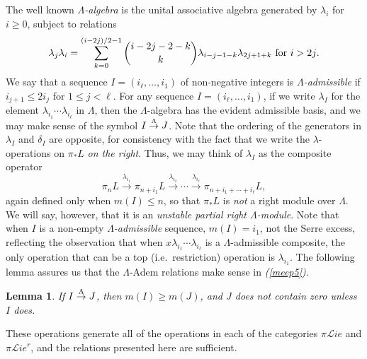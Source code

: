 \documentclass[11pt]{amsart} \renewcommand{\baselinestretch}{1.2}
\theoremstyle{plain}
\newtheorem{lem}[thm]{Lemma}
\numberwithin{equation}{section} %
\theoremstyle{plain}
\newtheorem{lem}[thm]{Lemma}
\numberwithin{equation}{chapter} %
\renewcommand{\to}{\longrightarrow}
\newcommand{\scrL}{\mathscr{L}}
\newcommand{\PA}[1]{\pi#1}
\newcommand{\minDimDelta}{m}
\newcommand{\produces}[3]{#3:#1\sim #2}
\renewcommand{\produces}[3]{#1\rightarrow_{#3} #2}%
\renewcommand{\produces}[3]{#1\overset{\smash{#3}}{\rightarrow} #2}%
\newcommand{\liealgs}{{\scrL\!\textit{ie}}}
\newcommand{\restliealgs}{{\scrL\!\textit{ie}^\textit{r}}}
\begin{document}
\begin{Constructing homotopy operations}
The well known \emph{$\Lambda$-algebra} is the unital associative algebra generated by $\lambda_i$ for $i\geq0$, subject to relations \[\lambda_j\lambda_i=\sum_{k=0}^{(i-2j)/2-1}\binom{i-2j-2-k}{ k}\lambda_{i-j-1-k}\lambda_{2j+1+k}\textup{\ for $i>2j$.}\]
We say that a sequence $I=(i_\ell,\ldots,i_1)$ of non-negative integers is \emph{$\Lambda$-admissible} if $i_{j+1}\leq 2i_j$ for $1\leq j <\ell$. 
For any sequence $I=(i_\ell,\ldots,i_1)$, if we write $\lambda_I$ for the element $\lambda_{i_1}\cdots \lambda_{i_\ell}$ in $\Lambda$, then the $\Lambda$-algebra has the evident admissible basis, and we may make sense of the symbol $\produces{I}{J}{\Lambda}$. Note that the ordering of the generators in $\lambda_I$ and $\delta_I$ are opposite, for consistency with the fact that we write the $\lambda$-operations on $\pi_*L$ \emph{on the right}. Thus, we may think of $\lambda_I$ as the composite operator  
\[\pi_{n}L\overset{\lambda_{i_1}}{\to}\pi_{n+i_1}L\overset{\lambda_{i_2}}{\to}\cdots \overset{\lambda_{i_\ell}}{\to}\pi_{n+i_1+\cdots +i_\ell}L,\]
again defined only when $\minDimDelta(I)\leq n$, so that $\pi_*L$ is \emph{not} a right module over $\Lambda$. We will say, however, that it is an \emph{unstable partial right $\Lambda$-module}.
Note that when $I$ is a non-empty \emph{$\Lambda$-admissible} sequence,
$\minDimDelta(I)=i_1$, not the Serre excess, reflecting the observation that when $x\lambda_{i_1}\cdots \lambda_{i_\ell}$ is a $\Lambda$-admissible composite, the only operation that  can be a top (i.e.\ restriction) operation is $\lambda_{i_1}$.
The following lemma assures us that the $\Lambda$-Adem relations make sense in \emph{(\ref{meep5})}.
\begin{lem}
\label{lemOnAdemChangeInMLambdaPlain}
If $\produces{I}{J}{\Lambda}$, then $\minDimDelta(I)\geq\minDimDelta(J)$, and $J$ does not contain zero unless $I$ does.
\end{lem}
These operations generate all of the operations in each of the categories $\PA{\liealgs}$ and $\PA{\restliealgs}$, and the relations presented here are sufficient. 



\end{Constructing homotopy operations}
\end{document}
